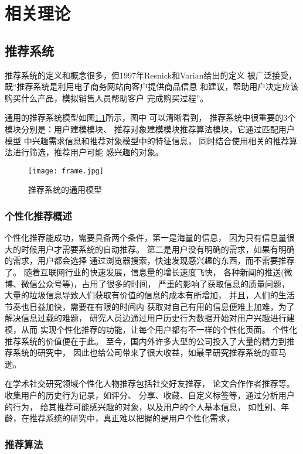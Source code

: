 ﻿\chapter{相关理论}
\section{推荐系统}
推荐系统的定义和概念很多，但1997年Resnick和Varian给出的定义%
被广泛接受，既“推荐系统是利用电子商务网站向客户提供商品信息%
和建议，帮助用户决定应该购买什么产品，模拟销售人员帮助客户%
完成购买过程”。%

通用的推荐系统模型如图\ref{fig:frame}所示，图中%
可以清晰看到，%
推荐系统中很重要的3个模块分别是：用户建模模块、%
推荐对象建模模块推荐算法模块，它通过匹配用户模型%
中兴趣需求信息和推荐对象模型中的特征信息，%
同时结合使用相关的推荐算法进行筛选，推荐用户可能%
感兴趣的对象。
\begin{figure}[htbp] %
  \centering
  \texttt{[image: frame.jpg]}
  \caption{推荐系统的通用模型}
  \label{fig:frame}
\end{figure}




\subsection{个性化推荐概述}
个性化推荐能成功，需要具备两个条件，第一是海量的信息，%
因为只有信息量很大的时候用户才需要系统的自动推荐。%
第二是用户没有明确的需求，如果有明确的需求，用户都会选择%
通过浏览器搜索，快速发现感兴趣的东西，而不需要推荐了。%
随着互联网行业的快速发展，信息量的增长速度飞快，%
各种新闻的推送(微博、微信公众号等)，占用了很多的时间，%
严重的影响了获取信息的质量问题，%
大量的垃圾信息导致人们获取有价值的信息的成本有所增加，%
并且，人们的生活节奏也日益加快，需要在有限的时间内%
获取对自己有用的信息便难上加难，为了解决信息过载的难题，%
研究人员边通过用户历史行为数据开始对用户兴趣进行建模，从而%
实现个性化推荐的功能，让每个用户都有不一样的个性化页面。%
个性化推荐系统的价值便在于此。%
至今，国内外许多大型的公司投入了大量的精力到推荐系统的研究中，%
因此也给公司带来了很大收益，如最早研究推荐系统的亚马逊。%

在学术社交研究领域个性化人物推荐包括社交好友推荐，%
论文合作作者推荐等。收集用户的历史行为记录，如评分、%
分享、收藏、自定义标签等，通过分析用户的行为，%
给其推荐可能感兴趣的对象，以及用户的个人基本信息，%
如性别、年龄，在推荐系统的研究中，真正难以把握的是用户个性化需求，
\subsection{推荐算法}


